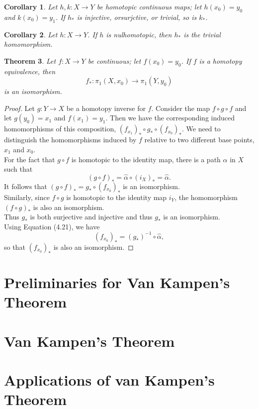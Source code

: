 \documentclass[psamsfonts]{amsart}
\newtheorem{thm}{Theorem}[section]
\newtheorem{cor}[thm]{Corollary}
\theoremstyle{definition}
\theoremstyle{remark}
\numberwithin{equation}{section}
\begin{document}
	\begin{cor}
		Let $h,k: X \to Y$ be homotopic continuous maps; let $h(x_0)=y_0$ and $k(x_0)=y_1$. If $h_*$ is injective, orsurjctive, or trivial, so is $k_*$.
	\end{cor}
	\begin{cor}
		Let $h: X \to Y$. If $h$ is nulhomotopic, then $h_*$ is the trivial homomorphism.
	\end{cor}
	\begin{thm}
		Let $f: X \to Y$ be continuous; let $f(x_0)=y_0$. If $f$ is a homotopy equivalence, then
		\begin{equation}
			f_*:\pi_1(X,x_0) \to \pi_1(Y,y_0)
		\end{equation}
		is an isomorphism.
	\end{thm}
	
	\begin{proof}
		Let $g: Y \to X$ be a homotopy inverse for $f$. Consider the map $f \circ g \circ f$ and let $g(y_0)=x_1$ and $f(x_1) = y_1$. Then we have the corresponding induced homomorphisms of this composition, $(f_{x_1})_* \circ g_* \circ (f_{x_0})_*$. We need to distinguish the homomorphisms induced by $f$ relative to two different base points, $x_1$ and $x_0$.\\
		For the fact that $g \circ f$ is homotopic to the identity map, there is a path $\alpha$ in $X$ such that
		\begin{equation}
			(g \circ f)_* = \hat{\alpha} \circ (i_X)_* = \hat{\alpha}.
		\end{equation}
		It follows that $(g \circ f)_* = g_* \circ (f_{x_0})_*$ is an isomorphism.\\
		Similarly, since $f \circ g$ is homotopic to the identity map $i_Y$, the homomorphism $(f \circ g)_*$ is also an isomorphism.\\
		Thus $g_*$ is both surjective and injective and thus $g_*$ is an isomorphism.\\
		Using Equation (4.21), we have
		\begin{equation}
			(f_{x_0})_* = (g_*)^{-1} \circ \hat{\alpha},
		\end{equation}
		so that $(f_{x_0})_*$ is also an isomorphism.
	\end{proof}

\section{Preliminaries for Van Kampen's Theorem}

\section{Van Kampen's Theorem}

\section{Applications of van Kampen's Theorem}
\end{document}
